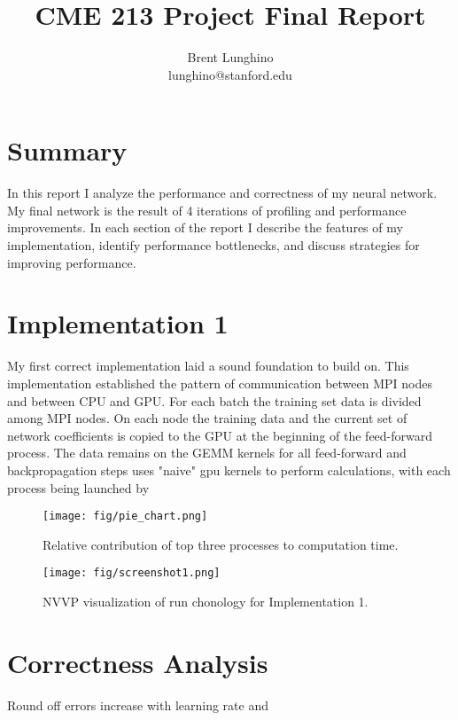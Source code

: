 \documentclass[12pt]{article}
\title{CME 213 Project Final Report}
\author{Brent Lunghino\\lunghino@stanford.edu}
\begin{document}
	
\maketitle

\section{Summary}

In this report I analyze the performance and correctness of my neural network. My final network is the result of 4 iterations of profiling and performance improvements. In each section of the report I describe the features of my implementation, identify performance bottlenecks, and discuss strategies for improving performance.

\section{Implementation 1}

My first correct implementation laid a sound foundation to build on. This implementation established the pattern of communication between MPI nodes and between CPU and GPU. For each batch the training set data is divided among MPI nodes. On each node the training data and the current set of network coefficients is copied to the GPU at the beginning of the feed-forward process. The data remains on the GEMM kernels for all feed-forward and backpropagation steps  uses "naive" gpu kernels to perform calculations, with each process being launched by 

\begin{figure}[htb]
	\begin{center}
		\texttt{[image: fig/pie\_chart.png]}
		\caption{Relative contribution of top three processes to computation time.}
		\label{fig:pie}
	\end{center}
\end{figure}

\begin{figure}[htb]
	\begin{center}
		\texttt{[image: fig/screenshot1.png]}
		\caption{NVVP visualization of run chonology for Implementation 1.}
		\label{fig:screenshot}
	\end{center}
\end{figure}
\FloatBarrier

\section{Correctness Analysis}

Round off errors increase with learning rate and 
\end{document}
